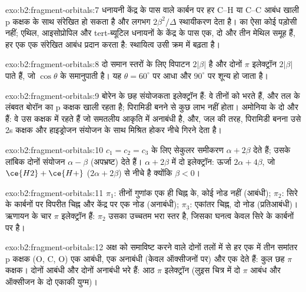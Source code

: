 \begin{solution}{exo:b2:fragment-orbitals:7}
धनायनी केंद्र के पास वाले कार्बन पर हर C--H या C--C आबंध
खाली p कक्षक के साथ संरेखित हो सकता है और लगभग $2\beta^2/\Delta$ स्थायीकरण देता है।  का ऐसा कोई
पड़ोसी नहीं; एथिल, आइसोप्रोपिल और tert-ब्यूटिल धनायनों के केंद्र के पास एक, दो और तीन मेथिल
समूह हैं, हर एक एक संरेखित आबंध प्रदान करता है: स्थायित्व उसी
क्रम में बढ़ता है।
\end{solution}

\begin{solution}{exo:b2:fragment-orbitals:8}
दो समान स्तरों के लिए विपाटन $2|\beta|$ है और दोनों $\pi$ इलेक्ट्रॉन $2|\beta|$ पाते हैं,
जो $\cos\theta$ के समानुपाती है। यह $\theta = 60^\circ$ पर आधा और
$90^\circ$ पर शून्य हो जाता है।
\end{solution}

\begin{solution}{exo:b2:fragment-orbitals:9}
बोरेन के छह संयोजकता इलेक्ट्रॉन हैं: वे तीनों  को भरते हैं, और तल के लंबवत
बोरॉन का p कक्षक खाली रहता है; पिरामिडी बनने से कुछ लाभ नहीं होता।
अमोनिया के दो और हैं: वे उस कक्षक में रहते हैं जो समतलीय आकृति में
अनाबंधी है, और, जल की तरह, पिरामिडी बनना उसे 2s कक्षक और
हाइड्रोजन संयोजन के साथ मिश्रित होकर नीचे गिरने देता है।
\end{solution}

\begin{solution}{exo:b2:fragment-orbitals:10}
$c_1 = c_2 = c_3$ के लिए सेकुलर समीकरण $\alpha + 2\beta$ देते हैं; उसके लांबिक दोनों संयोजन
$\alpha - \beta$ (अपभ्रष्ट) देते हैं। $\alpha + 2\beta$ में दो इलेक्ट्रॉन: ऊर्जा
$2\alpha + 4\beta$, जो $\ce{H2} + \ce{H+}$ ($2\alpha + 2\beta$) से नीचे है क्योंकि $\beta < 0$।
\end{solution}

\begin{solution}{exo:b2:fragment-orbitals:11}
$\pi_1$: तीनों गुणांक एक ही चिह्न के, कोई नोड नहीं (आबंधी); $\pi_2$: सिरे के कार्बनों पर
विपरीत चिह्न और केंद्र पर एक नोड (अनाबंधी); $\pi_3$: एकांतर
चिह्न, दो नोड (प्रतिआबंधी)। ऋणायन के चार $\pi$ इलेक्ट्रॉन हैं: $\pi_2$ उसका
उच्चतम भरा स्तर है, जिसका घनत्व केवल सिरे के कार्बनों पर है।
\end{solution}

\begin{solution}{exo:b2:fragment-orbitals:12}
अक्ष को समाविष्ट करने वाले दोनों तलों में से हर एक में तीन समांतर p कक्षक (O, C, O)
एक आबंधी, एक अनाबंधी (केवल ऑक्सीजनों पर) और एक  देते हैं: कुल छह
$\pi$ कक्षक। दोनों आबंधी और दोनों अनाबंधी भरे हैं: आठ
$\pi$ इलेक्ट्रॉन (लुइस चित्र में दो $\pi$ आबंध और ऑक्सीजन के दो एकाकी युग्म)।
\end{solution}

